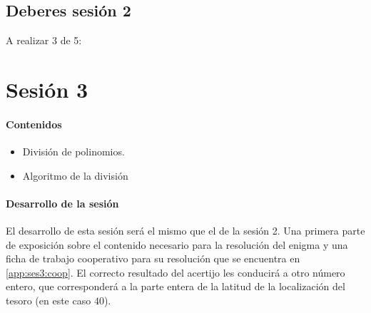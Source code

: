 \subsection{Deberes sesión 2}
\label{app:ses2:deberes}

\newbloq A realizar 3 de 5:









\section{Sesión 3}

\paragraph{Contenidos}
\begin{itemize}
	\item División de polinomios.
	\item Algoritmo de la división
\end{itemize}

\paragraph{Desarrollo de la sesión}

El desarrollo de esta sesión será el mismo que el de la sesión 2.
%
Una primera parte de exposición sobre el contenido necesario para la resolución del enigma y una ficha de trabajo cooperativo para su resolución que se encuentra en \ref{app:ses3:coop}.
%
El correcto resultado del acertijo les conducirá a otro número entero, que corresponderá a la parte entera de la latitud de la localización del tesoro (en este caso $40$).

